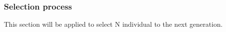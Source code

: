 \documentclass[conference]{IEEEtran}
\begin{document}
\subsubsection{Selection process}
This section will be applied to select N individual to the next generation. 
\end{document}

